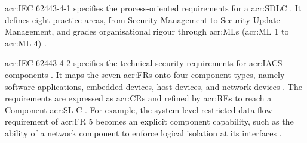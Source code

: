 \gls{acr:IEC} 62443-4-1 specifies the process-oriented requirements for a \gls{acr:SDLC} \cite[p. 8]{DIN_EN_IEC_62443_4_1_2018}. It defines eight practice areas, from Security Management to Security Update Management, and grades organisational rigour through \glspl{acr:ML} (\gls{acr:ML} 1 to \gls{acr:ML} 4) \cite[pp. 20]{DIN_EN_IEC_62443_4_1_2018}. 

\gls{acr:IEC} 62443-4-2 specifies the technical security requirements for \gls{acr:IACS} components \cite[p. 18]{IEC62443-4-2}. It maps the seven \glspl{acr:FR} onto four component types, namely software applications, embedded devices, host devices, and network devices \cite[p. 17]{IEC62443-4-2}. The requirements are expressed as \glspl{acr:CR} and refined by \glspl{acr:RE} to reach a Component \gls{acr:SL-C} \cite[pp. 31]{IEC62443-4-2}. For example, the system-level restricted-data-flow requirement of \gls{acr:FR} 5 becomes an explicit component capability, such as the ability of a network component to enforce logical isolation at its interfaces \cite[p. 61]{IEC62443-4-2}.